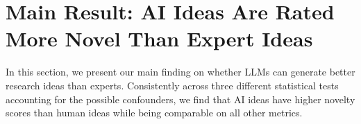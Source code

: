 \section{Main Result: AI Ideas Are Rated More Novel Than Expert Ideas}
\label{sec:results}

In this section, we present our main finding on whether LLMs can generate better research ideas than experts. Consistently across three different statistical tests accounting for the possible confounders, we find that AI ideas have higher novelty scores than human ideas while being comparable on all other metrics. 











